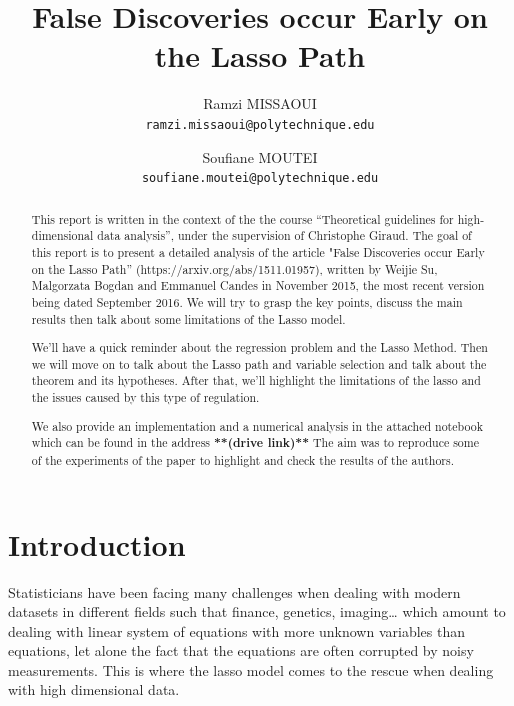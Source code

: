 \documentclass[10pt,onecolumn,letterpaper]{article}
\begin{document}
\title{False Discoveries occur Early on the Lasso Path}

\author{
   Ramzi MISSAOUI\\
{\tt\small ramzi.missaoui@polytechnique.edu}
\and
Soufiane MOUTEI\\
{\tt\small soufiane.moutei@polytechnique.edu}
}

\maketitle

\begin{abstract}
   This report is written in the context of the the course “Theoretical guidelines for high-dimensional data analysis”, under the supervision of Christophe Giraud.
The goal of this report is to present a detailed analysis of the article  "False Discoveries occur Early on the Lasso Path” (https://arxiv.org/abs/1511.01957),  written by Weijie Su, Malgorzata Bogdan and Emmanuel Candes in November 2015, the most recent version being dated September 2016. We will try to grasp the key points, discuss the main results then talk about some limitations of the Lasso model. 

We'll have a quick reminder about the regression problem and the Lasso Method. Then we will move on to talk about the Lasso path and variable selection and talk about the theorem and its hypotheses. After that, we’ll highlight the limitations of the lasso and the issues caused by this type of regulation.

We also provide an implementation and a numerical analysis in the attached notebook which can be found in the address \textbf{**(drive link)** }The aim was to reproduce some of the experiments of the paper to highlight and check the results of the authors.
\end{abstract}

\tableofcontents


\section{Introduction}

Statisticians have been facing many challenges when dealing with modern datasets in different fields such that finance, genetics, imaging… which amount to dealing with linear system of equations with more unknown variables than equations, let alone the fact that the equations are often corrupted by noisy measurements. This is where the lasso model comes to the rescue when dealing with high dimensional data.
\newline
\end{document}
